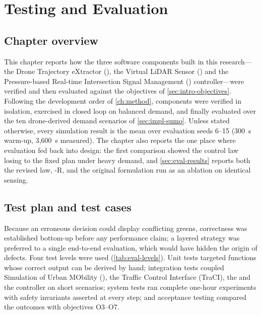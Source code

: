 \chapter{Testing and Evaluation}\label{ch:eval}

\section{Chapter overview}

This chapter reports how the three software components built in this research---the Drone Trajectory eXtractor (\dtx{}), the Virtual LiDAR Sensor (\vls{}) and the Pressure-based Real-time Intersection Signal Management (\prism{}) controller---were verified and then evaluated against the objectives of \cref{sec:intro-objectives}. Following the development order of \cref{ch:method}, components were verified in isolation, exercised in closed loop on balanced demand, and finally evaluated over the ten drone-derived demand scenarios of \cref{sec:impl-sumo}. Unless stated otherwise, every simulation result is the mean over evaluation seeds 6--15 (300~s warm-up, 3,600~s measured). The chapter also reports the one place where evaluation fed back into design: the first comparison showed the control law losing to the fixed plan under heavy demand, and \cref{sec:eval-results} reports both the revised law, \prism{}-R, and the original formulation run as an ablation on identical sensing.

\section{Test plan and test cases}\label{sec:eval-plan}

Because an erroneous \prism{} decision could display conflicting greens, correctness was established bottom-up before any performance claim; a layered strategy was preferred to a single end-to-end evaluation, which would have hidden the origin of defects. Four test levels were used (\cref{tab:eval-levels}). Unit tests targeted functions whose correct output can be derived by hand; integration tests coupled Simulation of Urban MObility (\sumo{}), the Traffic Control Interface (TraCI), the \vls{} and the controller on short scenarios; system tests ran complete one-hour experiments with safety invariants asserted at every step; and acceptance testing compared the outcomes with objectives O3--O7.

